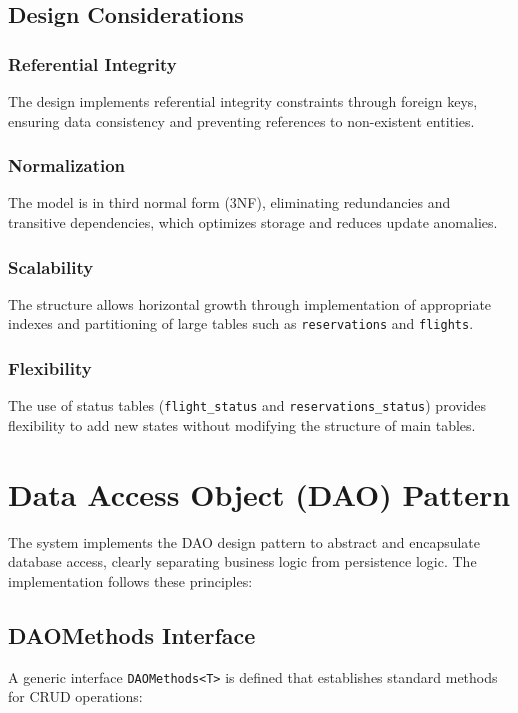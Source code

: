\documentclass[conference]{IEEEtran}
\begin{document}
    \subsection{Design Considerations}

    \subsubsection{Referential Integrity}
    The design implements referential integrity constraints through foreign keys, ensuring data consistency and preventing references to non-existent entities.

    \subsubsection{Normalization}
    The model is in third normal form (3NF), eliminating redundancies and transitive dependencies, which optimizes storage and reduces update anomalies.

    \subsubsection{Scalability}
    The structure allows horizontal growth through implementation of appropriate indexes and partitioning of large tables such as \texttt{reservations} and \texttt{flights}.

    \subsubsection{Flexibility}
    The use of status tables (\texttt{flight\_status} and \texttt{reservations\_status}) provides flexibility to add new states without modifying the structure of main tables.

    \section{Data Access Object (DAO) Pattern}

    The system implements the DAO design pattern to abstract and encapsulate database access, clearly separating business logic from persistence logic.
    The implementation follows these principles:

    \subsection{DAOMethods Interface}
    A generic interface \texttt{DAOMethods<T>} is defined that establishes standard methods for CRUD operations:
\end{document}
